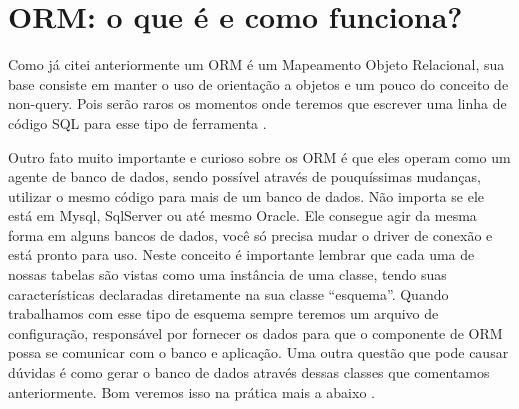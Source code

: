 \section{ORM: o que é e como funciona? }

Como já citei anteriormente um ORM é um Mapeamento Objeto Relacional, sua base consiste em manter o uso de orientação a objetos e um pouco do conceito de non-query. Pois serão raros os momentos onde teremos que escrever uma linha de código SQL para esse tipo de ferramenta \cite{Aylon2020Muramatsu}.

Outro fato muito importante e curioso sobre os ORM é que eles operam como um agente de banco de dados, sendo possível através de pouquíssimas mudanças, utilizar o mesmo código para mais de um banco de dados. Não importa se ele está em Mysql, SqlServer ou até mesmo Oracle. Ele consegue agir da mesma forma em alguns bancos de dados, você só precisa mudar o driver de conexão e está pronto para uso. Neste conceito é importante lembrar que cada uma de nossas tabelas são vistas como uma instância de uma classe, tendo suas características declaradas diretamente na sua classe ``esquema''. Quando trabalhamos com esse tipo de esquema sempre teremos um arquivo de configuração, responsável por fornecer os dados para que o componente de ORM possa se comunicar com o banco e aplicação. Uma outra questão que pode causar dúvidas é como gerar o banco de dados através dessas classes que comentamos anteriormente. Bom veremos isso na prática mais a abaixo \cite{Aylon2020Muramatsu}.